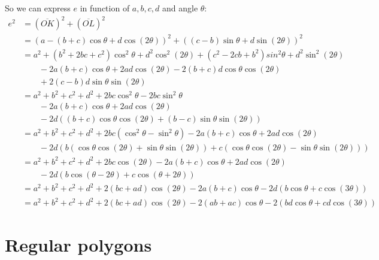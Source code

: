 \documentclass[11pt]{article}
\begin{document}
So we can express $e$ in function of $a,b,c,d$ and angle $\theta$:
\begin{align}
e^2 &= (\overline{OK})^2 + (\overline{OL})^2 \nonumber\\
 &= (a -(b+c)\cos\theta +d\cos(2\theta))^2 +((c-b)\sin\theta +d\sin(2\theta))^2 \nonumber\\
 &= a^2 +(b^2+2bc+c^2)\cos^2\theta + d^2\cos^2(2\theta) + (c^2-2cb+b^2)sin^2\theta +d^2\sin^2(2\theta) \nonumber\\
 &\qquad -2a(b+c)\cos\theta +2ad\cos(2\theta) -2(b+c)d\cos\theta\cos(2\theta) \nonumber\\
 &\qquad +2(c-b)d\sin\theta\sin(2\theta) \nonumber\\
%
 &= a^2 +b^2 +c^2 +d^2 +2bc\cos^2\theta -2bc\sin^2\theta \nonumber\\
 &\qquad -2a(b+c)\cos\theta +2ad\cos(2\theta) \nonumber\\
 &\qquad -2d((b+c)\cos\theta\cos(2\theta) + (b-c)\sin\theta\sin(2\theta)) \\
%
 &= a^2 +b^2 +c^2 +d^2 +2bc(\cos^2\theta -\sin^2\theta) 
  -2a(b+c)\cos\theta +2ad\cos(2\theta) \nonumber\\
 &\qquad -2d(b(\cos\theta\cos(2\theta)+\sin\theta\sin(2\theta)) 
  + c(\cos\theta\cos(2\theta)-\sin\theta\sin(2\theta))) \nonumber\\
%  
 &= a^2 +b^2 +c^2 +d^2 +2bc\cos(2\theta) 
  -2a(b+c)\cos\theta +2ad\cos(2\theta) \nonumber\\
 &\qquad -2d(b\cos(\theta-2\theta) + c\cos(\theta+2\theta)) \nonumber\\
% 
 &= a^2 +b^2 +c^2 +d^2 +2(bc+ad)\cos(2\theta) -2a(b+c)\cos\theta -2d(b\cos\theta + c\cos(3\theta)) \nonumber\\
% 
 &= a^2 +b^2 +c^2 +d^2 +2(bc+ad)\cos(2\theta) -2(ab+ac)\cos\theta -2(bd\cos\theta + cd\cos(3\theta)) \end{align}


\section{Regular polygons}
\end{document}

